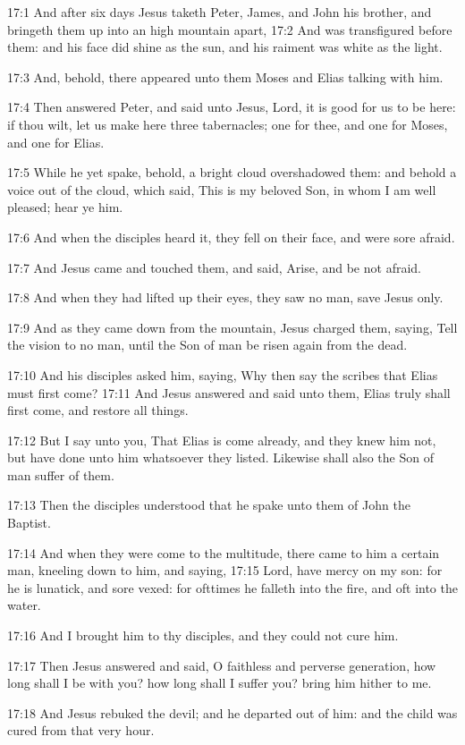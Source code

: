 17:1 And after six days Jesus taketh Peter, James, and John his brother, and bringeth them up into an high mountain apart, 17:2 And was transfigured before them: and his face did shine as the sun, and his raiment was white as the light.

17:3 And, behold, there appeared unto them Moses and Elias talking with him.

17:4 Then answered Peter, and said unto Jesus, Lord, it is good for us to be here: if thou wilt, let us make here three tabernacles; one for thee, and one for Moses, and one for Elias.

17:5 While he yet spake, behold, a bright cloud overshadowed them: and behold a voice out of the cloud, which said, This is my beloved Son, in whom I am well pleased; hear ye him.

17:6 And when the disciples heard it, they fell on their face, and were sore afraid.

17:7 And Jesus came and touched them, and said, Arise, and be not afraid.

17:8 And when they had lifted up their eyes, they saw no man, save Jesus only.

17:9 And as they came down from the mountain, Jesus charged them, saying, Tell the vision to no man, until the Son of man be risen again from the dead.

17:10 And his disciples asked him, saying, Why then say the scribes that Elias must first come?  17:11 And Jesus answered and said unto them, Elias truly shall first come, and restore all things.

17:12 But I say unto you, That Elias is come already, and they knew him not, but have done unto him whatsoever they listed. Likewise shall also the Son of man suffer of them.

17:13 Then the disciples understood that he spake unto them of John the Baptist.

17:14 And when they were come to the multitude, there came to him a certain man, kneeling down to him, and saying, 17:15 Lord, have mercy on my son: for he is lunatick, and sore vexed: for ofttimes he falleth into the fire, and oft into the water.

17:16 And I brought him to thy disciples, and they could not cure him.

17:17 Then Jesus answered and said, O faithless and perverse generation, how long shall I be with you? how long shall I suffer you?  bring him hither to me.

17:18 And Jesus rebuked the devil; and he departed out of him: and the child was cured from that very hour.

